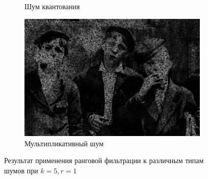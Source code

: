 \begin{figure}[ht!]
\begin{subfigure}[b]{0.5\linewidth}
      \caption{Шум квантования} 
      \label{rang_5_1:e}
    \end{subfigure}%
    \begin{subfigure}[b]{0.5\linewidth}
        \centering
        \includegraphics[width=0.95\linewidth]{../Rang_Filter/Rang_Speckle_noise_(k=5,r=1).jpg} 
        \caption{Мультипликативный шум} 
        \label{rang_5_1:f} 
    \end{subfigure} 
    \caption{Результат применения ранговой фильтрации к различным типам шумов при $k = 5, r = 1$}
    \label{img:rang_5_1} 
\end{figure}

